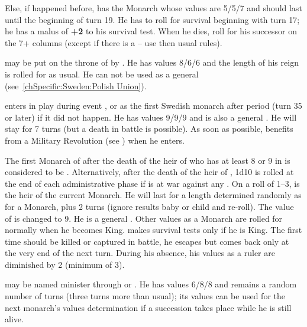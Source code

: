  Else, if 
happened before, \SUE has the Monarch  whose values
are 5/5/7 and should last until the beginning of turn 19.  He has to
roll for survival beginning with turn 17; he has a malus of {\bf +2} to
his survival test.  When he dies, roll for his successor on the 7+
columns (except if there is a  -- use then usual
rules).

 may be put on the throne of \SUE by
. He has values 8/6/6 and the length
of his reign is rolled for as usual. He can not be used as a general
(see~\ref{chSpecific:Sweden:Polish Union}).

 enters in play during event
, or as the first Swedish monarch after period
 (turn 35 or later) if it did not happen. He has values 9/9/9
and is also a general . He will stay for 7
turns (but a death in battle is possible). As soon as possible, \SUE
benefits from a Military Revolution (see ) when he enters.

\label{chSpecific:Sweden:Charles XII}
\bparag The first Monarch of \SUE after the death of the heir of
 who has at least 8 or 9 in \MIL is considered
to be .
\bparag Alternatively, after the death of the heir of , 1d10 is rolled at the end of each administrative phase if
\SUE is at war against any \MAJ. On a roll of 1--3,  is the heir of the current Monarch. He will last for a length
determined randomly as for a Monarch, plus 2 turns (ignore results baby
or child and re-roll).
\bparag The \MIL value of  is changed to 9. He is
a general . Other values as a Monarch are
rolled for normally when he becomes King.
\bparag {} makes survival tests only if he is King.
\bparag The first time  should be killed or
captured in battle, he escapes but comes back only at the very end of
the next turn. During his absence, his values as a ruler are diminished
by 2 (minimum of 3).

 may be named minister through
 or . He has values
6/8/8 and remains a random number of turns (three turns more than
usual); its values can be used for the next monarch's values
determination if a succession takes place while he is still alive.

